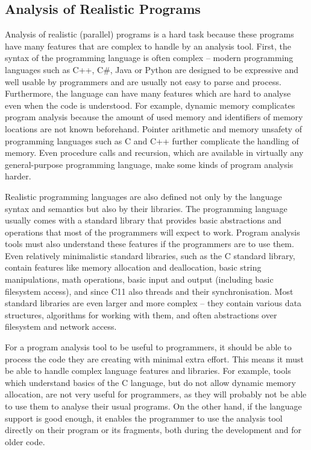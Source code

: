 \subsection{Analysis of Realistic Programs}\label{sec:intro:programs}

Analysis of realistic (parallel) programs is a hard task because these programs have many features that are complex to handle by an analysis tool.
First, the syntax of the programming language is often complex -- modern programming languages such as C++, C\#, Java or Python are designed to be expressive and well usable by programmers and are usually not easy to parse and process.
Furthermore, the language can have many features which are hard to analyse even when the code is understood.
For example, dynamic memory complicates program analysis because the amount of used memory and identifiers of memory locations are not known beforehand.
Pointer arithmetic and memory unsafety of programming languages such as C and C++ further complicate the handling of memory.
Even procedure calls and recursion, which are available in virtually any general-purpose programming language, make some kinds of program analysis harder.

Realistic programming languages are also defined not only by the language syntax and semantics but also by their libraries.
The programming language usually comes with a standard library that provides basic abstractions and operations that most of the programmers will expect to work.
Program analysis tools must also understand these features if the programmers are to use them.
Even relatively minimalistic standard libraries, such as the C standard library, contain features like memory allocation and deallocation, basic string manipulations, math operations, basic input and output (including basic filesystem access), and since C11 also threads and their synchronisation.
Most standard libraries are even larger and more complex -- they contain various data structures, algorithms for working with them, and often abstractions over filesystem and network access.

For a program analysis tool to be useful to programmers, it should be able to process the code they are creating with minimal extra effort.
This means it must be able to handle complex language features and libraries.
For example, tools which understand basics of the C language, but do not allow dynamic memory allocation, are not very useful for programmers, as they will probably not be able to use them to analyse their usual programs.
On the other hand, if the language support is good enough, it enables the programmer to use the analysis tool directly on their program or its fragments, both during the development and for older code.

